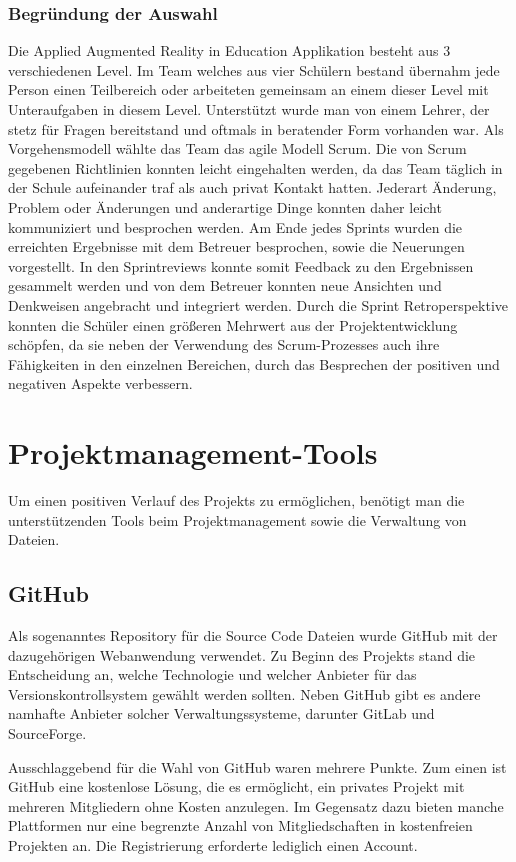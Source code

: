 \subsubsection{Begründung der Auswahl}
Die Applied Augmented Reality in Education Applikation besteht aus 3 verschiedenen Level.
Im Team welches aus vier Schülern bestand übernahm jede Person einen Teilbereich oder arbeiteten
gemeinsam an einem dieser Level mit Unteraufgaben in diesem Level. Unterstützt wurde man von einem
Lehrer, der stetz für Fragen bereitstand und oftmals in beratender Form vorhanden war. Als
Vorgehensmodell wählte das Team das agile Modell Scrum. Die von Scrum gegebenen Richtlinien
konnten leicht eingehalten werden, da das Team täglich in der Schule aufeinander
traf als auch privat Kontakt hatten. Jederart Änderung, Problem oder Änderungen und anderartige
Dinge konnten daher leicht kommuniziert und besprochen werden. Am Ende jedes Sprints wurden
die erreichten Ergebnisse mit dem Betreuer besprochen, sowie die Neuerungen vorgestellt.
In den Sprintreviews konnte somit Feedback zu den Ergebnissen gesammelt werden und von dem
Betreuer konnten neue Ansichten und Denkweisen angebracht und integriert werden.
Durch die Sprint Retroperspektive konnten die Schüler einen größeren Mehrwert aus der
Projektentwicklung schöpfen, da sie neben der Verwendung des Scrum-Prozesses auch ihre Fähigkeiten
in den einzelnen Bereichen, durch das Besprechen der positiven und negativen Aspekte verbessern.

\section{Projektmanagement-Tools}
Um einen positiven Verlauf des Projekts zu ermöglichen, benötigt man die unterstützenden
Tools beim Projektmanagement sowie die Verwaltung von Dateien.

\subsection{GitHub}
Als sogenanntes Repository für die Source Code Dateien wurde GitHub mit der dazugehörigen
Webanwendung verwendet. Zu Beginn des Projekts stand die Entscheidung an, welche Technologie
und welcher Anbieter für das Versionskontrollsystem gewählt werden sollten. Neben GitHub gibt es
andere namhafte Anbieter solcher Verwaltungssysteme, darunter GitLab und SourceForge.

Ausschlaggebend für die Wahl von GitHub waren mehrere Punkte. Zum einen ist GitHub eine
kostenlose Lösung, die es ermöglicht, ein privates Projekt mit mehreren Mitgliedern
ohne Kosten anzulegen. Im Gegensatz dazu bieten manche Plattformen nur eine begrenzte Anzahl
von Mitgliedschaften in kostenfreien Projekten an. Die Registrierung erforderte lediglich
einen Account.

